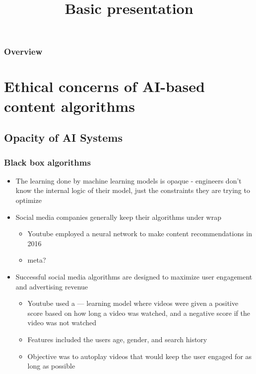 \documentclass{beamer}
\title{Basic presentation}
\begin{document}
\begin{frame} 
	\titlepage 
\end{frame}

\begin{frame} 
\frametitle{Overview}
	\tableofcontents
\end{frame}

\section{Ethical concerns of AI-based content algorithms}

\subsection{Opacity of AI Systems}


\begin{frame}
\frametitle{Black box algorithms}

  	\begin{itemize}

		\item The learning done by machine learning models is opaque - engineers don't know the internal logic of their model, just the constraints they are trying to optimize
		\item Social media companies generally keep their algorithms under wrap
			\begin{itemize}
				\item Youtube employed a neural network to make content recommendations in 2016
				\item meta?
			\end{itemize}
		\item Successful social media algorithms are designed to maximize user engagement and advertising revenue

			\begin{itemize}
				\item Youtube used a --- learning model where videos were given a positive score based on how long a video was watched, and a negative score if the video was not watched
				\item Features included the users age, gender, and search history
				\item Objective was to autoplay videos that would keep the user engaged for as long as possible

			\end{itemize}

		
  	\end{itemize}

\end{frame}
\end{document}
